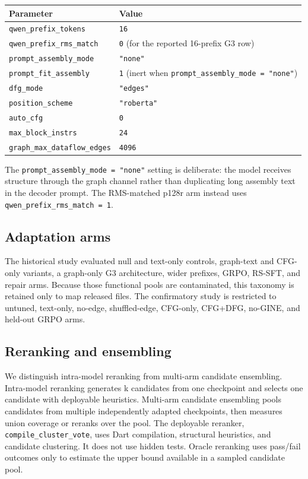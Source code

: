 \documentclass[11pt]{article}
\begin{document}
\begin{table}[h]
\centering
\small
\begin{tabular}{@{}ll@{}}
\toprule
Parameter & Value \\
\midrule
\texttt{qwen\_prefix\_tokens} & \texttt{16} \\
\texttt{qwen\_prefix\_rms\_match} & \texttt{0} (for the reported 16-prefix G3 row) \\
\texttt{prompt\_assembly\_mode} & \texttt{"none"} \\
\texttt{prompt\_fit\_assembly} & \texttt{1} (inert when \texttt{prompt\_assembly\_mode = "none"}) \\
\texttt{dfg\_mode} & \texttt{"edges"} \\
\texttt{position\_scheme} & \texttt{"roberta"} \\
\texttt{auto\_cfg} & \texttt{0} \\
\texttt{max\_block\_instrs} & \texttt{24} \\
\texttt{graph\_max\_dataflow\_edges} & \texttt{4096} \\
\bottomrule
\end{tabular}
\end{table}

The \texttt{prompt\_assembly\_mode = "none"} setting is deliberate: the model receives structure through the graph channel rather than duplicating long assembly text in the decoder prompt. The RMS-matched p128r arm instead uses \texttt{qwen\_prefix\_rms\_match = 1}.

\subsection{Adaptation arms}

The historical study evaluated null and text-only controls, graph-text and CFG-only variants, a graph-only G3 architecture, wider prefixes, GRPO, RS-SFT, and repair arms. Because those functional pools are contaminated, this taxonomy is retained only to map released files. The confirmatory study is restricted to untuned, text-only, no-edge, shuffled-edge, CFG-only, CFG+DFG, no-GINE, and held-out GRPO arms.

\subsection{Reranking and ensembling}

We distinguish intra-model reranking from multi-arm candidate ensembling. Intra-model reranking generates k candidates from one checkpoint and selects one candidate with deployable heuristics. Multi-arm candidate ensembling pools candidates from multiple independently adapted checkpoints, then measures union coverage or reranks over the pool. The deployable reranker, \texttt{compile\_cluster\_vote}, uses Dart compilation, structural heuristics, and candidate clustering. It does not use hidden tests. Oracle reranking uses pass/fail outcomes only to estimate the upper bound available in a sampled candidate pool.
\end{document}
